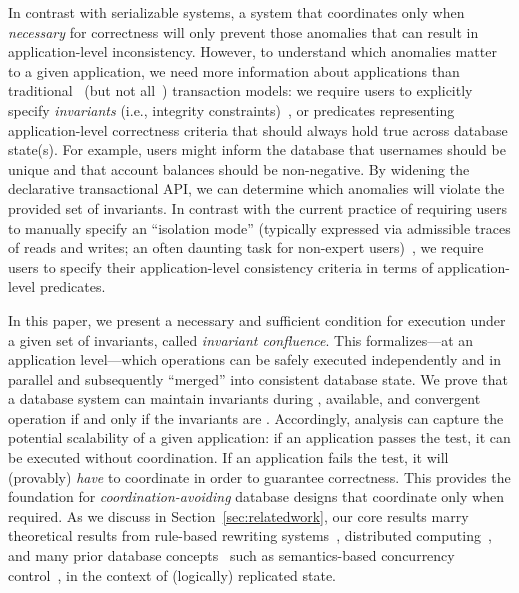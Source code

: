 
In contrast with serializable systems, a system that coordinates only
when \textit{necessary} for correctness will only prevent those
anomalies that can result in application-level inconsistency. However,
to understand which anomalies matter to a given application, we need
more information about applications than
traditional~\cite{bernstein-book,gray-virtues} (but not
all~\cite{eswaran-consistency,korth-serializability,decomp-semantics,garciamolina-semantics,activedb-book,ic-survey,ic-survey-two})
transaction models: we require users to explicitly specify
\textit{invariants} (i.e., integrity constraints)~\cite{traiger-tods},
or predicates representing application-level correctness criteria that
should always hold true across database state(s). For example, users
might inform the database that usernames should be unique and that
account balances should be non-negative. By widening the declarative
transactional API, we can determine which anomalies will violate the
provided set of invariants. In contrast with the current practice of
requiring users to manually specify an ``isolation mode'' (typically
expressed via admissible traces of reads and writes; an often daunting
task for non-expert users)~\cite{consistency-borders}, we require
users to specify their application-level consistency criteria in terms
of application-level predicates.

In this paper, we present a necessary and sufficient condition for
\cfree execution under a given set of invariants, called
\textit{invariant confluence}. This \iconfluence formalizes---at an
application level---which operations can be safely executed
independently and in parallel and subsequently ``merged'' into
consistent database state. We prove that a database system can
maintain invariants during \cfree, available, and convergent operation
if and only if the invariants are \iconfluent. Accordingly,
\iconfluence analysis can capture the potential scalability of a given
application: if an application passes the \iconfluence test, it can be
executed without coordination. If an application fails the test, it
will (provably) \textit{have} to coordinate in order to guarantee
correctness. This provides the foundation for
\textit{coordination-avoiding} database designs that coordinate only
when required. As we discuss in Section~\ref{sec:relatedwork}, our
core results marry theoretical results from rule-based rewriting
systems~\cite{obs-confluence,termrewriting}, distributed
computing~\cite{herlihy-apologizing,gilbert-cap,hat-vldb}, and many
prior database concepts~\cite{activedb-book,ic-survey,ic-survey-two}
such as semantics-based concurrency
control~\cite{sdd1,decomp-semantics,badrinath-semantics,garciamolina-semantics,korth-serializability,atomictransactions,weihl-thesis},
in the context of (logically) replicated state.


